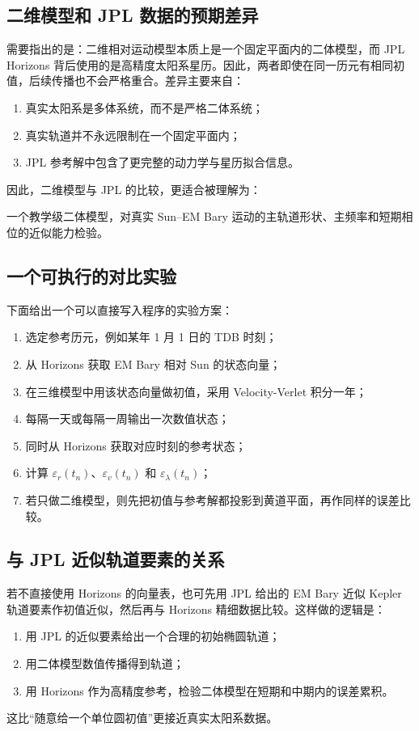 \documentclass[12pt,a4paper]{ctexrep}
\begin{document}
\subsection{二维模型和 JPL 数据的预期差异}

需要指出的是：二维相对运动模型本质上是一个固定平面内的二体模型，而 JPL Horizons 背后使用的是高精度太阳系星历。因此，两者即使在同一历元有相同初值，后续传播也不会严格重合。差异主要来自：
\begin{enumerate}[label=\arabic*.]
  \item 真实太阳系是多体系统，而不是严格二体系统；
  \item 真实轨道并不永远限制在一个固定平面内；
  \item JPL 参考解中包含了更完整的动力学与星历拟合信息。
\end{enumerate}

因此，二维模型与 JPL 的比较，更适合被理解为：
\begin{center}
一个教学级二体模型，对真实 Sun--EM Bary 运动的主轨道形状、主频率和短期相位的近似能力检验。
\end{center}

\subsection{一个可执行的对比实验}

下面给出一个可以直接写入程序的实验方案：
\begin{enumerate}[label=\arabic*.]
  \item 选定参考历元，例如某年 1 月 1 日的 TDB 时刻；
  \item 从 Horizons 获取 EM Bary 相对 Sun 的状态向量；
  \item 在三维模型中用该状态向量做初值，采用 Velocity-Verlet 积分一年；
  \item 每隔一天或每隔一周输出一次数值状态；
  \item 同时从 Horizons 获取对应时刻的参考状态；
  \item 计算 \(\varepsilon_r(t_n)\)、\(\varepsilon_v(t_n)\) 和 \(\varepsilon_\lambda(t_n)\)；
  \item 若只做二维模型，则先把初值与参考解都投影到黄道平面，再作同样的误差比较。
\end{enumerate}

\subsection{与 JPL 近似轨道要素的关系}

若不直接使用 Horizons 的向量表，也可先用 JPL 给出的 EM Bary 近似 Kepler 轨道要素作初值近似，然后再与 Horizons 精细数据比较。这样做的逻辑是：
\begin{enumerate}[label=\arabic*.]
  \item 用 JPL 的近似要素给出一个合理的初始椭圆轨道；
  \item 用二体模型数值传播得到轨道；
  \item 用 Horizons 作为高精度参考，检验二体模型在短期和中期内的误差累积。
\end{enumerate}
这比“随意给一个单位圆初值”更接近真实太阳系数据。
\end{document}
